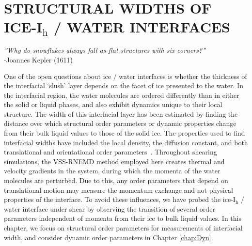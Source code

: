 
\chapter{STRUCTURAL WIDTHS OF ICE-I$_\mathrm{h}$ / WATER
  INTERFACES}\label{chap:Str}


\begin{flushright}
\textit{''Why do snowflakes always fall as flat structures with six corners?''} \\
-Joannes Kepler (1611) \\
\end{flushright}

One of the open questions about ice / water interfaces is whether the
thickness of the interfacial `slush' layer depends on the facet of ice
presented to the water. In the interfacial region, the water molecules
are ordered differently than in either the solid or liquid phases, and
also exhibit dynamics unique to their local structure.  The width of
this interfacial layer has been estimated by finding the distance over
which structural order parameters or dynamic properties change from
their bulk liquid values to those of the solid ice. The properties
used to find interfacial widths have included the local density, the
diffusion constant, and both translational and orientational order
parameters~\cite{Karim1988,Karim1990,Hayward2001,Hayward2002,Bryk2002,Gay2002,Louden2013a}. Throughout
shearing simulations, the VSS-RNEMD method employed here creates
thermal and velocity gradients in the system, during which the momenta
of the water molecules are perturbed. Due to this, any order parameters that
depend on translational motion may measure the momentum exchange and
not physical properties of the interface. To avoid these influences,
we have probed the ice-I$_\mathrm{h}$ / water interface under shear by
observing the transition of several order parameters independent of
momenta from their ice to bulk liquid values.  In this chapter, we
focus on structural order parameters for measurements of interfacial
width, and consider dynamic order parameters in Chapter
\ref{chap:Dyn}.

